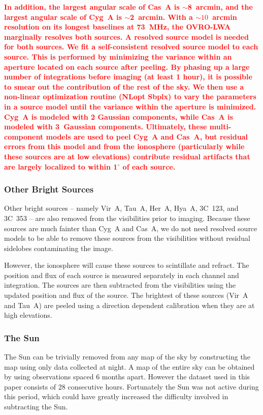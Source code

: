 \documentclass[twocolumn]{aastex61}
\newcommand{\revision}[1]{\textcolor{red}{\textbf{#1}}}
\begin{document}
\revision{
    In addition, the largest angular scale of Cas~A is $\sim$8~arcmin, and the largest angular scale
    of Cyg~A is $\sim$2~arcmin. With a $\sim10$~arcmin resolution on its longest baselines at
    73~MHz, the OVRO-LWA marginally resolves both sources. A resolved source model is needed for
    both sources. We fit a self-consistent resolved source model to each source. This is performed
    by minimizing the variance within an aperture located on each source after peeling. By phasing
    up a large number of integrations before imaging (at least 1 hour), it is possible to smear out
    the contribution of the rest of the sky.  We then use a non-linear optimization routine (NLopt
    Sbplx) \citep{nlopt, sbplx} to vary the parameters in a source model until the variance within
    the aperture is minimized. Cyg~A is modeled with 2 Gaussian components, while Cas~A is modeled
    with 3~Gaussian components.  Ultimately, these multi-component models are used to peel Cyg~A and
    Cas~A, but residual errors from this model and from the ionosphere (particularly while these
    sources are at low elevations) contribute residual artifacts that are largely localized to
    within 1$^\circ$ of each source.
}

\subsubsection{Other Bright Sources}

Other bright sources -- namely Vir~A, Tau~A, Her~A, Hya~A, 3C~123, and 3C~353 -- are also removed
from the visibilities prior to imaging. Because these sources are much fainter than Cyg~A and Cas~A,
we do not need resolved source models to be able to remove these sources from the visibilities
without residual sidelobes contaminating the image.

However, the ionosphere will cause these sources to scintillate and refract. The position and flux
of each source is measured separately in each channel and integration. The sources are then
subtracted from the visibilities using the updated position and flux of the source. The brightest of
these sources (Vir~A and Tau~A) are peeled using a direction dependent calibration when they are at
high elevations.

\subsubsection{The Sun}

The Sun can be trivially removed from any map of the sky by constructing the map using only data
collected at night. A map of the entire sky can be obtained by using observations spaced 6 months
apart.  However the dataset used in this paper consists of 28 consecutive hours. Fortunately the Sun
was not active during this period, which could have greatly increased the difficulty involved in
subtracting the Sun.
\end{document}
